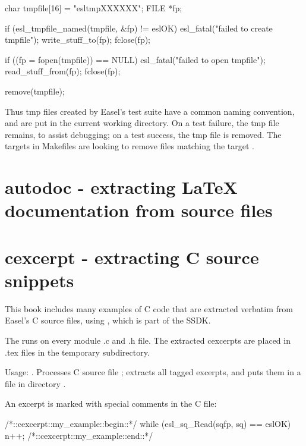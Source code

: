 \begin{cchunk}
   char  tmpfile[16] = "esltmpXXXXXX";
   FILE *fp;

   if (esl_tmpfile_named(tmpfile, &fp) != eslOK) esl_fatal("failed to create tmpfile");
   write_stuff_to(fp);
   fclose(fp);

   if ((fp = fopen(tmpfile)) == NULL) esl_fatal("failed to open tmpfile");
   read_stuff_from(fp);
   fclose(fp);

   remove(tmpfile);
\end{cchunk}

Thus tmp files created by Easel's test suite have a common naming
convention, and are put in the current working directory. On a test
failure, the tmp file remains, to assist debugging; on a test success,
the tmp file is removed. The  targets in Makefiles
are looking to remove files matching the target .






\section{autodoc - extracting LaTeX documentation from source files}





\section{cexcerpt - extracting C source snippets}

This book includes many examples of C code that are extracted verbatim
from Easel's C source files, using , which is part of
the SSDK.

The  runs  on every
module .c and .h file. The extracted cexcerpts are placed in .tex
files in the temporary  subdirectory.

Usage: . Processes C source file
; extracts all tagged excerpts, and puts them in a file
in directory .

An excerpt is marked with special comments in the C file:
\begin{cchunk}
/*::cexcerpt::my_example::begin::*/
   while (esl_sq_Read(sqfp, sq) == eslOK)
     { n++; }
/*::cexcerpt::my_example::end::*/
\end{cchunk}

